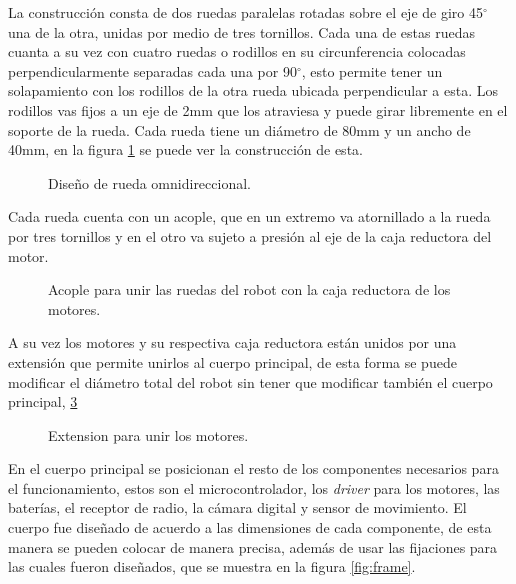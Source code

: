\documentclass{iccmemoria}
\begin{document}
La construcción consta de dos ruedas paralelas rotadas sobre el eje de giro 45$^{\circ}$ una de la otra, unidas por medio de tres tornillos. Cada una de estas ruedas cuanta a su vez con cuatro ruedas o rodillos en su circunferencia colocadas perpendicularmente separadas cada una por 90$^{\circ}$, esto permite tener un solapamiento con los rodillos de la otra rueda ubicada perpendicular a esta. Los rodillos vas fijos a un eje de 2mm que los atraviesa y puede girar libremente en el soporte de la rueda. Cada rueda tiene un diámetro de 80mm y un ancho de 40mm, en la figura \ref{fig:image_omni_whell_2} se puede ver la construcción de esta.\\

\begin{figure}[H]
  \centering
  
  \caption{Diseño de rueda omnidireccional.}
  \label{fig:image_omni_whell_2}
\end{figure}

Cada rueda cuenta con un acople, que en un extremo va atornillado a la rueda por tres tornillos y en el otro va sujeto a presión al eje de la caja reductora del motor.\\

\begin{figure}[H]
  \centering
  
  \caption{Acople para unir las ruedas del robot con la caja reductora de los motores.}
  \label{fig:arm}
\end{figure}

A su vez los motores y su respectiva caja reductora están unidos por una extensión que permite unirlos al cuerpo principal, de esta forma se puede modificar el diámetro total del robot sin tener que modificar también el cuerpo principal, \ref{fig:arm}\\

\begin{figure}[H]
  \centering
  
  \caption{Extension para unir los motores.}
  \label{fig:arm}
\end{figure}

En el cuerpo principal se posicionan el resto de los componentes necesarios para el funcionamiento, estos son el microcontrolador, los \emph{driver} para los motores, las baterías, el receptor de radio, la cámara digital y sensor de movimiento. El cuerpo fue diseñado de acuerdo a las dimensiones de cada componente, de esta manera se pueden colocar de manera precisa, además de usar las fijaciones para las cuales fueron diseñados, que se muestra en la figura \ref{fig:frame}.\\
\end{document}
